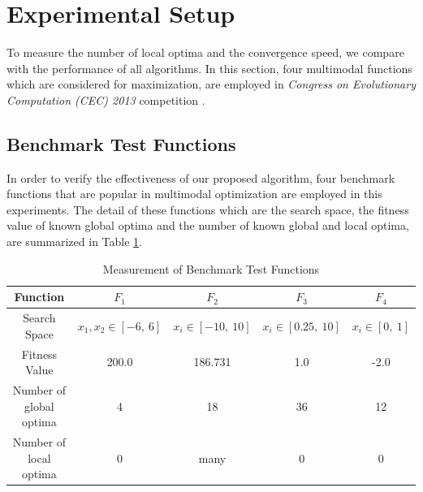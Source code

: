 \documentclass[conference]{IEEEtran}
\begin{document}
\section{Experimental Setup}
To measure the number of local optima and the convergence speed, we compare with the performance of all algorithms. In this section, four multimodal functions which are considered for maximization, are employed in \textit{Congress on Evolutionary Computation (CEC) 2013} competition \cite{cec2013}. 
\subsection{Benchmark Test Functions}
In order to verify the effectiveness of our proposed algorithm, four benchmark functions that are popular in multimodal optimization are employed in this experiments. The detail of these functions which are the search space, the fitness value of known global optima and the number of known global and local optima, are summarized in Table \ref{tab1}.


\begin{table}[h]
\caption{Measurement of Benchmark Test Functions}
\begin{center}
\begin{tabular}{c|c|c|c|c}
\hline
Function & ${F_1}$ & ${F_2}$ & ${F_3}$ & ${F_4}$ \\
\hline
Search Space & $x_1, x_2 \in [-6, \ 6]$ & $x_i \in [-10, \ 10]$ & $x_i \in [0.25, \ 10]$ & $x_i \in [0, \ 1]$\\
\hline
Fitness Value & 200.0 & 186.731 & 1.0 & -2.0   \\
\hline
Number of global optima & 4 & 18 & 36 & 12 \\
\hline
Number of local optima &  0 & many & 0 & 0  \\
\hline
\end{tabular}
\label{tab1}
\end{center}
\end{table}
\end{document}
